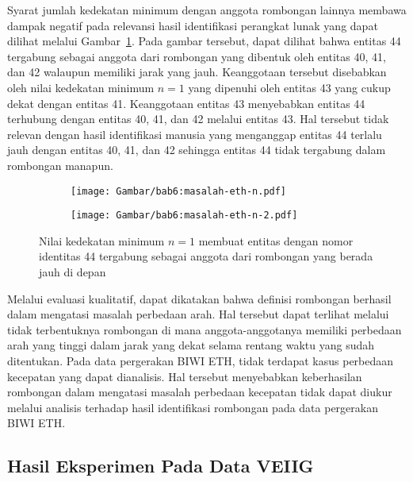 Syarat jumlah kedekatan minimum dengan anggota rombongan lainnya membawa dampak negatif pada relevansi hasil identifikasi perangkat lunak yang dapat dilihat melalui Gambar~\ref{bab6:masalah-eth-n}. Pada gambar tersebut, dapat dilihat bahwa entitas 44 tergabung sebagai anggota dari rombongan yang dibentuk oleh entitas 40, 41, dan 42 walaupun memiliki jarak yang jauh. Keanggotaan tersebut disebabkan oleh nilai kedekatan minimum $n = 1$ yang dipenuhi oleh entitas 43 yang cukup dekat dengan entitas 41. Keanggotaan entitas 43 menyebabkan entitas 44 terhubung dengan entitas 40, 41, dan 42 melalui entitas 43. Hal tersebut tidak relevan dengan hasil identifikasi manusia yang menganggap entitas 44 terlalu jauh dengan entitas 40, 41, dan 42 sehingga entitas 44 tidak tergabung dalam rombongan manapun.

\begin{figure}[h]
    \centering
    \captionsetup{width=.6\textwidth}
    \begin{subfigure}[h]{0.185\textwidth}
        \centering
        \texttt{[image: Gambar/bab6:masalah-eth-n.pdf]}
    \end{subfigure}
    \begin{subfigure}[h]{0.185\textwidth}
        \centering
        \texttt{[image: Gambar/bab6:masalah-eth-n-2.pdf]}
    \end{subfigure}
    \caption[Masalah nilai $n$ pada data BIWI ETH]{Nilai kedekatan minimum $n = 1$ membuat entitas dengan nomor identitas 44 tergabung sebagai anggota dari rombongan yang berada jauh di depan}
    \label{bab6:masalah-eth-n}
\end{figure}

Melalui evaluasi kualitatif, dapat dikatakan bahwa definisi rombongan berhasil dalam mengatasi masalah perbedaan arah. Hal tersebut dapat terlihat melalui tidak terbentuknya rombongan di mana anggota-anggotanya memiliki perbedaan arah yang tinggi dalam jarak yang dekat selama rentang waktu yang sudah ditentukan. Pada data pergerakan BIWI ETH, tidak terdapat kasus perbedaan kecepatan yang dapat dianalisis. Hal tersebut menyebabkan keberhasilan rombongan dalam mengatasi masalah perbedaan kecepatan tidak dapat diukur melalui analisis terhadap hasil identifikasi rombongan pada data pergerakan BIWI ETH.

\subsection{Hasil Eksperimen Pada Data VEIIG}
\label{subsec:veiig-result}

